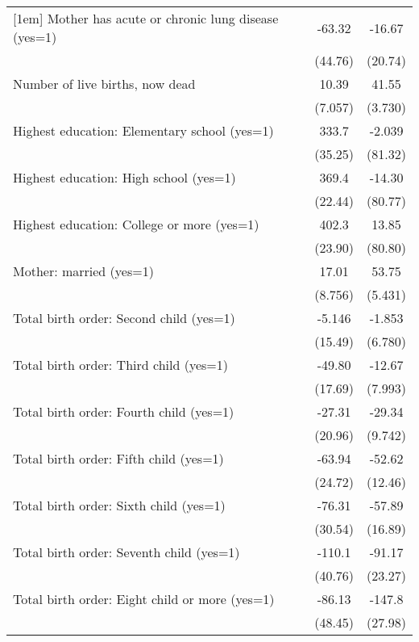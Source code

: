 \begin{tabular}{l*{2}{c}}
[1em]
Mother has acute or chronic lung disease (yes=1)&      -63.32&      -16.67\\
                    &     (44.76)&     (20.74)\\
[1em]
Number of live births, now dead&       10.39&       41.55\\
                    &     (7.057)&     (3.730)\\
[1em]
Highest education: Elementary school (yes=1)&       333.7&      -2.039\\
                    &     (35.25)&     (81.32)\\
[1em]
Highest education: High school (yes=1)&       369.4&      -14.30\\
                    &     (22.44)&     (80.77)\\
[1em]
Highest education: College or more (yes=1)&       402.3&       13.85\\
                    &     (23.90)&     (80.80)\\
[1em]
Mother: married (yes=1)&       17.01&       53.75\\
                    &     (8.756)&     (5.431)\\
[1em]
Total birth order: Second child (yes=1)&      -5.146&      -1.853\\
                    &     (15.49)&     (6.780)\\
[1em]
Total birth order: Third child (yes=1)&      -49.80&      -12.67\\
                    &     (17.69)&     (7.993)\\
[1em]
Total birth order: Fourth child (yes=1)&      -27.31&      -29.34\\
                    &     (20.96)&     (9.742)\\
[1em]
Total birth order: Fifth child (yes=1)&      -63.94&      -52.62\\
                    &     (24.72)&     (12.46)\\
[1em]
Total birth order: Sixth child (yes=1)&      -76.31&      -57.89\\
                    &     (30.54)&     (16.89)\\
[1em]
Total birth order: Seventh child (yes=1)&      -110.1&      -91.17\\
                    &     (40.76)&     (23.27)\\
[1em]
Total birth order: Eight child or more (yes=1)&      -86.13&      -147.8\\
                    &     (48.45)&     (27.98)\\

\end{tabular}
